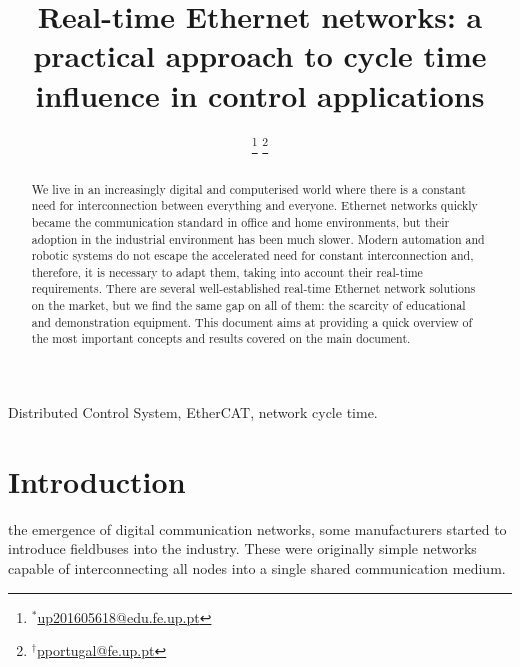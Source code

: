 \documentclass[a4paper]{IEEEtran}
\begin{document}
\title{Real-time Ethernet networks: a practical approach to cycle time influence in control applications}


\author{%
\thanks{$^*$\href{mailto:up201605618@edu.fe.up.pt}{up201605618@edu.fe.up.pt}}
%
\thanks{$^\dag$\href{mailto:pportugal@fe.up.pt}{pportugal@fe.up.pt}}
}
\maketitle


\begin{abstract}
  We live in an increasingly digital and computerised world where there is a constant need for interconnection between everything and everyone.
  Ethernet networks quickly became the communication standard in office and home environments, but their adoption in the industrial environment has been much slower.
  Modern automation and robotic systems do not escape the accelerated need for constant interconnection and, therefore, it is necessary to adapt them, taking into account their real-time requirements.
There are several well-established real-time Ethernet network solutions on the market, but we find the same gap on all of them: the scarcity of educational and demonstration equipment.
  This document aims at providing a quick overview of the most important concepts and results covered on the main document.
\end{abstract}

\begin{IEEEkeywords}
Distributed Control System, EtherCAT, network cycle time.
\end{IEEEkeywords}

\section{Introduction}

 the emergence of digital communication networks, some manufacturers started to introduce fieldbuses into the industry.  These were originally simple networks capable of interconnecting all nodes into a single shared communication medium.
\end{document}
